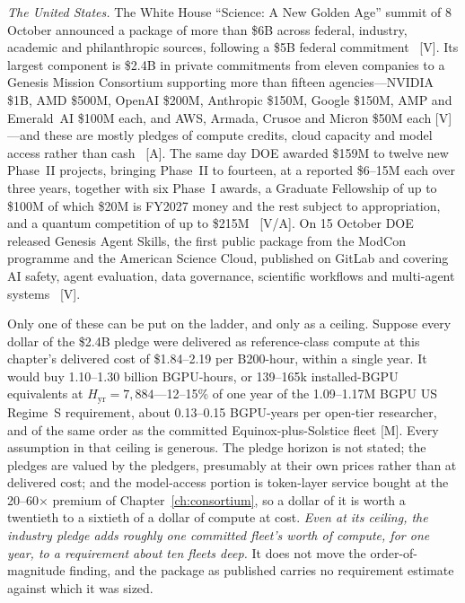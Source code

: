 \emph{The United States.} The White House ``Science: A New Golden Age'' summit of 8 October announced a package of more than \$6B across federal, industry, academic and philanthropic sources, following a \$5B federal commitment~\cite{sci-wh-summit} [V]. Its largest component is \$2.4B in private commitments from eleven companies to a Genesis Mission Consortium supporting more than fifteen agencies---NVIDIA \$1B, AMD \$500M, OpenAI \$200M, Anthropic \$150M, Google \$150M, AMP and Emerald~AI \$100M each, and AWS, Armada, Crusoe and Micron \$50M each [V]---and these are mostly pledges of compute credits, cloud capacity and model access rather than cash~\cite{sci-cdo-genesis} [A]. The same day DOE awarded \$159M to twelve new Phase~II projects, bringing Phase~II to fourteen, at a reported \$6--15M each over three years, together with six Phase~I awards, a Graduate Fellowship of up to \$100M of which \$20M is FY2027 money and the rest subject to appropriation, and a quantum competition of up to \$215M~\cite{sci-doe-phase2,sci-grantedai} [V/A]. On 15 October DOE released Genesis Agent Skills, the first public package from the ModCon programme and the American Science Cloud, published on GitLab and covering AI safety, agent evaluation, data governance, scientific workflows and multi-agent systems~\cite{sci-genesis-skills} [V].

Only one of these can be put on the ladder, and only as a ceiling. Suppose every dollar of the \$2.4B pledge were delivered as reference-class compute at this chapter's delivered cost of \$1.84--2.19 per B200-hour, within a single year. It would buy 1.10--1.30 billion BGPU-hours, or 139--165k installed-BGPU equivalents at $H_{\mathrm{yr}} = 7{,}884$---12--15\% of one year of the 1.09--1.17M BGPU US Regime~S requirement, about 0.13--0.15 BGPU-years per open-tier researcher, and of the same order as the committed Equinox-plus-Solstice fleet [M]. Every assumption in that ceiling is generous. The pledge horizon is not stated; the pledges are valued by the pledgers, presumably at their own prices rather than at delivered cost; and the model-access portion is token-layer service bought at the 20--60$\times$ premium of Chapter~\ref{ch:consortium}, so a dollar of it is worth a twentieth to a sixtieth of a dollar of compute at cost. \emph{Even at its ceiling, the industry pledge adds roughly one committed fleet's worth of compute, for one year, to a requirement about ten fleets deep.} It does not move the order-of-magnitude finding, and the package as published carries no requirement estimate against which it was sized.

